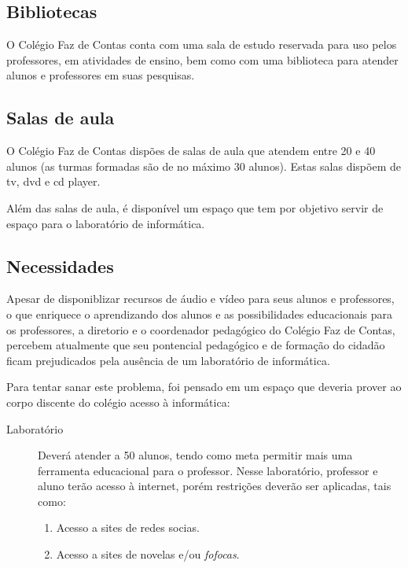         \subsection{Bibliotecas}
        O Colégio Faz de Contas conta com uma sala de estudo reservada
        para uso pelos professores, em atividades de ensino, bem como com
        uma biblioteca para atender alunos e professores em suas pesquisas.

        \subsection{Salas de aula}
        O Colégio Faz de Contas dispões de salas de aula que atendem entre
        20 e 40 alunos (as turmas formadas são de no máximo 30 alunos).
        Estas salas dispõem de tv, dvd e cd player.

        Além das salas de aula, é disponível um espaço que tem por
        objetivo servir de espaço para o laboratório de informática.

        \subsection{Necessidades}
        Apesar de disponiblizar recursos de áudio e vídeo para seus alunos e
        professores, o que enriquece o aprendizando dos alunos e as
        possibilidades educacionais para os professores, a diretorio e o
        coordenador pedagógico do Colégio Faz de Contas, percebem atualmente
        que seu pontencial pedagógico e de formação do cidadão ficam
        prejudicados pela ausência de um laboratório de informática.

        Para tentar sanar este problema, foi pensado em um espaço que
        deveria prover ao corpo discente do colégio acesso à informática:

        \begin{description}

            \item[Laboratório] Deverá atender a 50 alunos, tendo como meta
            permitir mais uma ferramenta educacional para o professor. Nesse
            laboratório, professor e aluno terão acesso à internet, porém
            restrições deverão ser aplicadas, tais como:

            \begin{enumerate}

                \item Acesso a sites de redes socias.

                \item Acesso a sites de novelas e/ou \emph{fofocas}.

            \end{enumerate}

        \end{description}

